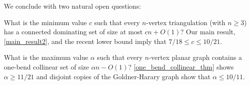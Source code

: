 \documentclass[11pt]{article}
\theoremstyle{definition}
\begin{document}
We conclude with two natural open questions:

\begin{compactenum}
  \item What is the minimum value $c$ such that every $n$-vertex triangulation (with $n\geq 3$) has a connected dominating set of size at most $c n+O(1)$? Our main result, \cref{main_result2}, and the recent lower bound \cite{enami2025contributionsconjecturesplanargraphs} imply that $7/18 \leq c\leq 10/21$.

  \item What is the maximum value $\alpha$ such that every $n$-vertex planar graph contains a one-bend collinear set of size $\alpha n-O(1)$?  \cref{one_bend_collinear_thm} shows $\alpha \ge 11/21$ and disjoint copies of the Goldner-Harary graph show that $\alpha \le 10/11$.

\end{compactenum}








% 
\end{document}
